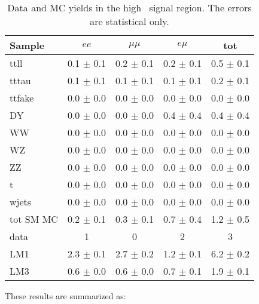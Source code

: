 \begin{table}[hbt]
\begin{center}
\caption{\label{tab:sigyield3} Data and MC yields in the high \Ht\ signal region.
The errors are statistical only.}
\begin{tabular}{l|cccc}
\hline
         Sample   &           $ee$   &       $\mu\mu$   &         $e\mu$   &            tot  \\
\hline
           ttll   &  0.1 $\pm$ 0.1   &  0.2 $\pm$ 0.1   &  0.2 $\pm$ 0.1   &  0.5 $\pm$ 0.1  \\
          tttau   &  0.1 $\pm$ 0.1   &  0.1 $\pm$ 0.1   &  0.1 $\pm$ 0.1   &  0.2 $\pm$ 0.1  \\
         ttfake   &  0.0 $\pm$ 0.0   &  0.0 $\pm$ 0.0   &  0.0 $\pm$ 0.0   &  0.0 $\pm$ 0.0  \\
             DY   &  0.0 $\pm$ 0.0   &  0.0 $\pm$ 0.0   &  0.4 $\pm$ 0.4   &  0.4 $\pm$ 0.4  \\
             WW   &  0.0 $\pm$ 0.0   &  0.0 $\pm$ 0.0   &  0.0 $\pm$ 0.0   &  0.0 $\pm$ 0.0  \\
             WZ   &  0.0 $\pm$ 0.0   &  0.0 $\pm$ 0.0   &  0.0 $\pm$ 0.0   &  0.0 $\pm$ 0.0  \\
             ZZ   &  0.0 $\pm$ 0.0   &  0.0 $\pm$ 0.0   &  0.0 $\pm$ 0.0   &  0.0 $\pm$ 0.0  \\
              t   &  0.0 $\pm$ 0.0   &  0.0 $\pm$ 0.0   &  0.0 $\pm$ 0.0   &  0.0 $\pm$ 0.0  \\
          wjets   &  0.0 $\pm$ 0.0   &  0.0 $\pm$ 0.0   &  0.0 $\pm$ 0.0   &  0.0 $\pm$ 0.0  \\
\hline
      tot SM MC   &  0.2 $\pm$ 0.1   &  0.3 $\pm$ 0.1   &  0.7 $\pm$ 0.4   &  1.2 $\pm$ 0.5  \\
\hline
           data   &              1   &              0   &              2   &              3  \\
\hline
            LM1   &  2.3 $\pm$ 0.1   &  2.7 $\pm$ 0.2   &  1.2 $\pm$ 0.1   &  6.2 $\pm$ 0.2  \\
            LM3   &  0.6 $\pm$ 0.0   &  0.6 $\pm$ 0.0   &  0.7 $\pm$ 0.1   &  1.9 $\pm$ 0.1  \\
\hline
\end{tabular}
\end{center}
\end{table}

\newpage

These results are summarized as:

